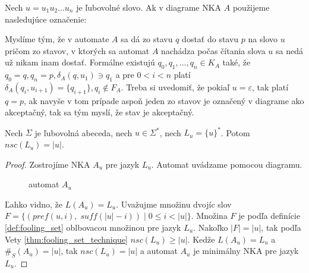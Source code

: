 \begin{notation}
\normalfont
Nech $ u = u_1u_2 \ldots u_n$ je ľubovolné slovo. Ak v diagrame NKA $ A $ použijeme nasledujúce označenie:
\begin{figure}[H]
\centering
{}
\end{figure}

Myslíme tým, že v automate $ A $ sa dá zo stavu $ q $ dostať do stavu $ p $ na slovo $ u $ pričom zo stavov, v ktorých sa automat $ A $ nachádza počas čítania slova $ u $ sa nedá už nikam inam dostať. Formálne existujú $ q_0, q_1, \ldots, q_n \in K_A $ také, že $ q_0 = q, q_n = p, \delta_A(q, u_1) \ni q_1 $ a pre $ 0 < i < n $ platí $ \delta_A(q_i,u_{i+1}) = \lbrace q_{i+1} \rbrace, q_i \notin F_A $. Treba si uvedomiť, že pokiaľ $ u = \varepsilon $, tak platí $ q=p $, ak navyše v tom prípade aspoň jeden zo stavov je označený v diagrame ako akceptačný, tak sa tým myslí, že stav je akceptačný.
\end{notation}

\begin{lemma}
\label{lm:one_word_cycle_nsc}
Nech $ \Sigma $ je ľubovolná abeceda, nech $ u \in \Sigma^* $, nech $ L_u = \lbrace u \rbrace^* $. Potom $ nsc(L_u) = |u| $.
\end{lemma}

\begin{proof}
Zostrojíme NKA $ A_u $ pre jazyk $ L_u $. Automat uvádzame pomocou diagramu.

\begin{figure}[H]
\centering
{}
\caption{automat $ A_u $}
\end{figure}
Ľahko vidno, že $ L(A_u) = L_u $. Uvažujme množinu dvojíc slov $ F = \lbrace (pref(u,i), \; suff(|u|-i)) \; | \; 0 \leq i < |u| \rbrace $. Množina $ F $ je podľa definície \ref{def:fooling_set} oblbovacou množinou pre jazyk $ L_u $. Nakoľko $ |F|=|u| $, tak podľa Vety \ref{thm:fooling_set_technique} $ nsc(L_u) \geq |u| $. Kedže $ L(A_u) = L_u $ a $ \#_S(A_u) = |u| $, tak $ nsc(L_u) = |u| $ a automat $ A_u $ je minimálny NKA pre jazyk $ L_u $.
\end{proof}

